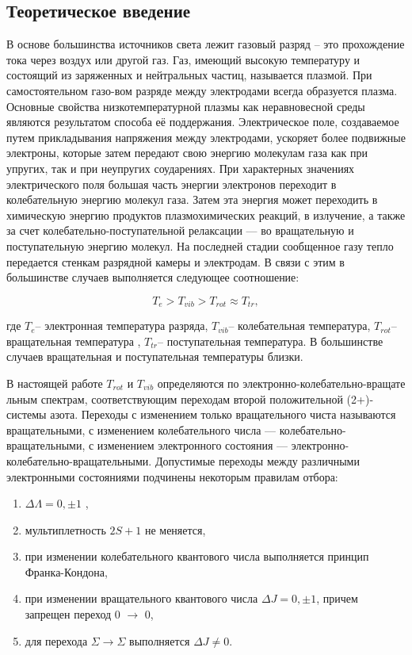 \subsection{Теоретическое введение}
В основе большинства источников света лежит газовый разряд – это прохождение тока через воздух или другой газ. Газ, имеющий высокую температуру и состоящий из заряженных и нейтральных частиц, называется плазмой. При самостоятельном газо-вом разряде между электродами всегда образуется плазма.
Основные свойства низкотемпературной плазмы как неравновесной среды являются результатом способа её поддержания. Электрическое поле, создаваемое путем прикладывания напряжения между электродами, ускоряет более подвижные электроны, которые затем передают свою энергию молекулам газа как при упругих, так и при неупругих соударениях. При характерных значениях электрического поля большая часть энергии электронов переходит в колебательную энергию молекул газа. Затем эта энергия может переходить в химическую энергию продуктов плазмохимических реакций, в излучение, а также за счет колебательно-поступательной релаксации — во вращательную и поступательную энергию молекул. На последней стадии сообщенное газу тепло передается стенкам разрядной камеры и электродам. В связи с этим в большинстве случаев выполняется следующее соотношение: 

\begin{equation}
T_e > T_{vib} > T_{rot} \approx T_{tr},
\end{equation}

где $T_e$-- электронная температура разряда, $T_{vib}$-- колебательная температура, $T_{rot}$-- вращательная температура , $T_{tr}$-- поступательная температура. В большинстве случаев вращательная и поступательная температуры близки.

В настоящей работе $T_{rot}$ и $T_{vib}$ определяются по электронно-колебательно-вращате
льным спектрам, соответствующим переходам второй положительной (2+)-системы азота. Переходы с изменением только вращательного чиста называются вращательными, с изменением колебательного числа — колебательно-вращательными, с изменением электронного состояния — электронно-колебательно-вращательными. Допустимые переходы между различными электронными состояниями подчинены некоторым правилам отбора:

\begin{enumerate}
	
	\item $\Delta \Lambda = 0, \pm 1 $ , 
	\item мультиплетность $2S+1$ не меняется,
	\item при изменении колебательного квантового числа выполняется принцип Франка-Кондона,
	\item при изменении вращательного квантового числа $\Delta J = 0, \pm 1 $, причем запрещен переход 0 $\rightarrow $ 0,
	\item для перехода $ \Sigma \rightarrow \Sigma $ выполняется $ \Delta J \neq 0$.	
\end{enumerate}


